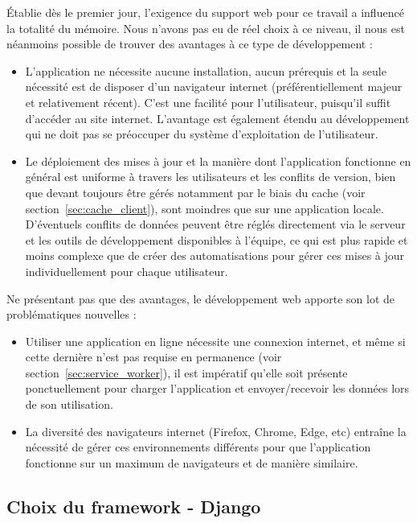 \documentclass{EPL-master-thesis-covers-FR}
\begin{document}
				\'Etablie dès le premier jour, l'exigence du support web pour ce travail a influencé la totalité du mémoire. Nous n'avons pas eu de réel choix à ce niveau, il nous est néanmoins possible de trouver des avantages à ce type de développement :
				\begin{itemize}
					\item L'application ne nécessite aucune installation, aucun prérequis et la seule nécessité est de disposer d'un navigateur internet (préférentiellement majeur et relativement récent). C'est une facilité pour l'utilisateur, puisqu'il suffit d'accéder au site internet. L'avantage est également étendu au développement qui ne doit pas se préoccuper du système d'exploitation de l'utilisateur.
					\item Le déploiement des mises à jour et la manière dont l'application fonctionne en général est uniforme à travers les utilisateurs et les conflits de version, bien que devant toujours être gérés notamment par le biais du cache (voir section~\ref{sec:cache_client}), sont moindres que sur une application locale. D'éventuels conflits de données peuvent être réglés directement via le serveur et les outils de développement disponibles à l'équipe, ce qui est plus rapide et moins complexe que de créer des automatisations pour gérer ces mises à jour individuellement pour chaque utilisateur.
				\end{itemize}

				Ne présentant pas que des avantages, le développement web apporte son lot de problématiques nouvelles :
				\begin{itemize}
					\item Utiliser une application en ligne nécessite une connexion internet, et même si cette dernière n'est pas requise en permanence (voir section~\ref{sec:service_worker}), il est impératif qu'elle soit présente ponctuellement pour charger l'application et envoyer/recevoir les données lors de son utilisation.
					\item La diversité des navigateurs internet (Firefox, Chrome, Edge, etc) entraîne la nécessité de gérer ces environnements différents pour que l'application fonctionne sur un maximum de navigateurs et de manière similaire.
				\end{itemize}

			\subsection*{Choix du framework - Django}
\end{document}
